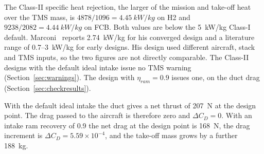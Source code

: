 \documentclass[a4paper,11pt]{article}
\begin{document}
The Class-II specific heat rejection, the larger of the mission and take-off heat over the
TMS mass, is $4878/1096 = \SI{4.45}{kW/kg}$ on H2 and $9238/2082 = \SI{4.44}{kW/kg}$ on
FCB. Both values are below the \SI{5}{kW/kg} Class-I default. Marconi~\cite{marconi2026}
reports \SI{2.74}{kW/kg} for his converged design and a literature range of
0.7--\SI{3}{kW/kg} for early designs. His design used different aircraft, stack and TMS
inputs, so the two figures are not directly comparable. The Class-II designs with the
default ideal intake issue no TMS warning (Section~\ref{sec:warnings}). The design with
$\eta_{ram} = 0.9$ issues one, on the duct drag (Section~\ref{sec:checkresults}).

With the default ideal intake the duct gives a net thrust of \SI{207}{N} at the design
point. The drag passed to the aircraft is therefore zero and $\Delta C_D = 0$. With an
intake ram recovery of 0.9 the net drag at the design point is \SI{168}{N}, the drag
increment is $\Delta C_D = 5.59\times10^{-4}$, and the take-off mass grows by a further
\SI{188}{kg}.
\end{document}
